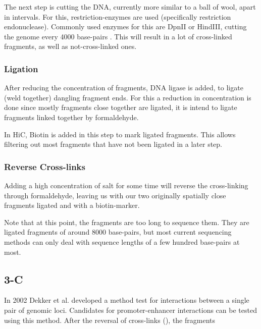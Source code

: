 The next step is cutting the DNA, currently more similar to a ball of wool,
apart in intervals. For this, restriction-enzymes are used (specifically
restriction endonuclease). Commonly used enzymes for this are DpnII or HindIII,
cutting the genome every 4000 base-pairs \cite{liebermann2009comprehensive}.
This will result in a lot of cross-linked fragments, as well as
not-cross-linked ones.

\subsubsection{Ligation}\label{sec:ligation}

After reducing the concentration of fragments, DNA ligase is added, to ligate
(weld together) dangling fragment ends. For this a reduction in concentration
is done since mostly fragments close together are ligated, it is intend to
ligate fragments linked together by formaldehyde.

In HiC, Biotin is added in this step to mark ligated fragments. This allows
filtering out most fragments that have not been ligated in a later step.


\subsubsection{Reverse Cross-links}\label{sec:revcrosslink}

Adding a high concentration of salt for some time will reverse the
cross-linking through formaldehyde, leaving us with our two originally
spatially close fragments ligated and with a biotin-marker.


Note that at this point, the fragments are too long to sequence them.
They are ligated fragments of around 8000 base-pairs, but most current
sequencing methods can only deal with sequence lengths of a few hundred
base-pairs at most.




\subsection{3-C}\label{sec:3C}

In 2002 Dekker et al. \cite{dekker2002capturing} developed a method test for interactions
between a single pair of genomic loci. Candidates for promoter-enhancer
interactions can be tested using this method.
After the reversal of cross-links (), the fragments



